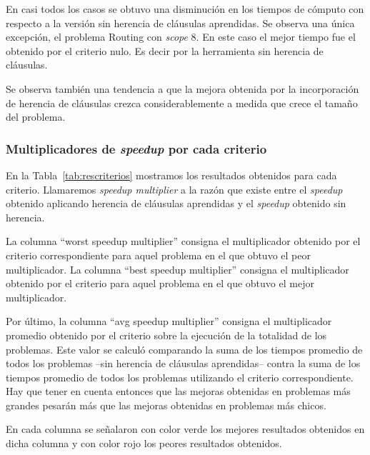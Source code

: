 En casi todos los casos se obtuvo una disminución en los tiempos de cómputo
con respecto a la versión sin herencia de cláusulas aprendidas. Se observa una
única excepción, el problema Routing con \emph{scope} 8. En este caso el mejor
tiempo fue el obtenido por el criterio nulo. Es decir por la herramienta sin
herencia de cláusulas.

Se observa también una tendencia a que la mejora obtenida por la incorporación
de herencia de cláusulas crezca considerablemente a medida que crece el tamaño
del problema.

\subsubsection{Multiplicadores de \emph{speedup} por cada criterio}

En la Tabla~\ref{tab:rescriterios} mostramos los resultados obtenidos para
cada criterio. Llamaremos \emph{speedup multiplier} a la razón que existe
entre el \emph{speedup} obtenido aplicando herencia de cláusulas aprendidas y
el \emph{speedup} obtenido sin herencia.

La columna ``worst speedup multiplier'' consigna el multiplicador obtenido por
el criterio correspondiente para aquel problema en el que obtuvo el peor
multiplicador. La columna ``best speedup multiplier'' consigna el
multiplicador obtenido por el criterio para aquel problema en el que obtuvo el
mejor multiplicador.

Por último, la columna ``avg speedup multiplier'' consigna el multiplicador
promedio obtenido por el criterio sobre la ejecución de la totalidad de los
problemas. Este valor se calculó comparando la suma de los tiempos promedio de
todos los problemas --sin herencia de cláusulas aprendidas-- contra la suma de
los tiempos promedio de todos los problemas utilizando el criterio
correspondiente. Hay que tener en cuenta entonces que las mejoras obtenidas en
problemas más grandes pesarán más que las mejoras obtenidas en problemas más
chicos.

En cada columna se señalaron con color verde los mejores resultados obtenidos
en dicha columna y con color rojo los peores resultados obtenidos.

